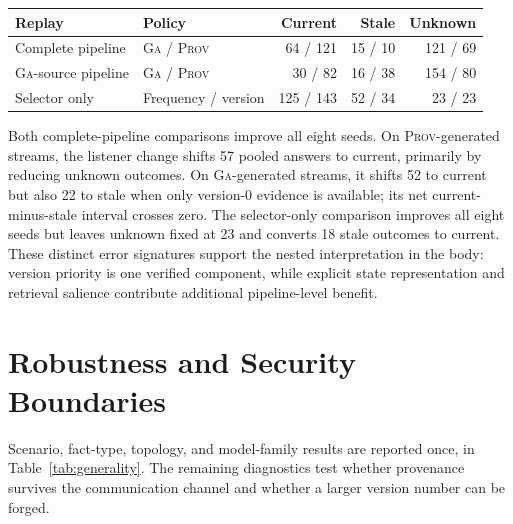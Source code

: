 \documentclass[sigconf,anonymous]{acmart}
\newcommand{\prov}{\textsc{Prov}}
\newcommand{\ga}{\textsc{Ga}}
\begin{document}
\begin{table}[!t]
  \vspace{3pt}
  \begin{tabular}{@{}llrrr@{}}
    \toprule
    Replay & Policy & Current & Stale & Unknown \\
    \midrule
    Complete pipeline & \ga{} / \prov{} & 64 / 121 & 15 / 10 & 121 / 69 \\
    \ga{}-source pipeline & \ga{} / \prov{} & 30 / 82 & 16 / 38 & 154 / 80 \\
    Selector only & Frequency / version & 125 / 143 & 52 / 34 & 23 / 23 \\
    \bottomrule
  \end{tabular}
\end{table}

Both complete-pipeline comparisons improve all eight seeds.  On \prov{}-generated streams, the
listener change shifts 57 pooled answers to current, primarily by reducing unknown outcomes.  On
\ga{}-generated streams, it shifts 52 to current but also 22 to stale when only version-0 evidence
is available; its net current-minus-stale interval crosses zero.  The selector-only comparison improves all
eight seeds but leaves unknown fixed at 23 and converts 18 stale outcomes to current.  These
distinct error signatures support the nested interpretation in the body: version priority is
one verified component, while explicit state representation and retrieval salience contribute
additional pipeline-level benefit.
\FloatBarrier

\section{Robustness and Security Boundaries}
\label{app:robustness}
\label{app:attack}

Scenario, fact-type, topology, and model-family results are reported once, in
Table~\ref{tab:generality}.  The remaining diagnostics test whether provenance survives the
communication channel and whether a larger version number can be forged.
\end{document}
